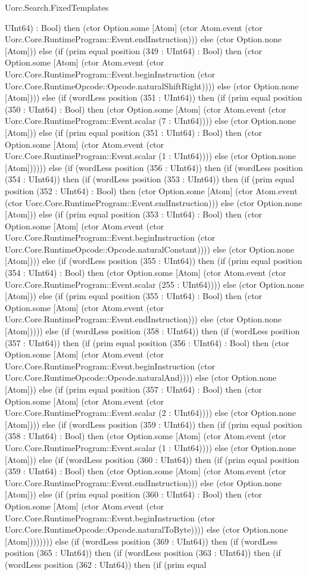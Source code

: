 \begin{lexlean}{Uorc.Search.FixedTemplates}
\begin{semanticmodule}
{UInt64) : Bool) then (ctor Option.some [Atom] (ctor Atom.event (ctor Uorc.Core.RuntimeProgram::Event.endInstruction))) else (ctor Option.none [Atom])) else (if (prim equal position (349 : UInt64) : Bool) then (ctor Option.some [Atom] (ctor Atom.event (ctor Uorc.Core.RuntimeProgram::Event.beginInstruction (ctor Uorc.Core.RuntimeOpcode::Opcode.naturalShiftRight)))) else (ctor Option.none [Atom]))) else (if (wordLess position (351 : UInt64)) then (if (prim equal position (350 : UInt64) : Bool) then (ctor Option.some [Atom] (ctor Atom.event (ctor Uorc.Core.RuntimeProgram::Event.scalar (7 : UInt64)))) else (ctor Option.none [Atom])) else (if (prim equal position (351 : UInt64) : Bool) then (ctor Option.some [Atom] (ctor Atom.event (ctor Uorc.Core.RuntimeProgram::Event.scalar (1 : UInt64)))) else (ctor Option.none [Atom]))))) else (if (wordLess position (356 : UInt64)) then (if (wordLess position (354 : UInt64)) then (if (wordLess position (353 : UInt64)) then (if (prim equal position (352 : UInt64) : Bool) then (ctor Option.some [Atom] (ctor Atom.event (ctor Uorc.Core.RuntimeProgram::Event.endInstruction))) else (ctor Option.none [Atom])) else (if (prim equal position (353 : UInt64) : Bool) then (ctor Option.some [Atom] (ctor Atom.event (ctor Uorc.Core.RuntimeProgram::Event.beginInstruction (ctor Uorc.Core.RuntimeOpcode::Opcode.naturalConstant)))) else (ctor Option.none [Atom]))) else (if (wordLess position (355 : UInt64)) then (if (prim equal position (354 : UInt64) : Bool) then (ctor Option.some [Atom] (ctor Atom.event (ctor Uorc.Core.RuntimeProgram::Event.scalar (255 : UInt64)))) else (ctor Option.none [Atom])) else (if (prim equal position (355 : UInt64) : Bool) then (ctor Option.some [Atom] (ctor Atom.event (ctor Uorc.Core.RuntimeProgram::Event.endInstruction))) else (ctor Option.none [Atom])))) else (if (wordLess position (358 : UInt64)) then (if (wordLess position (357 : UInt64)) then (if (prim equal position (356 : UInt64) : Bool) then (ctor Option.some [Atom] (ctor Atom.event (ctor Uorc.Core.RuntimeProgram::Event.beginInstruction (ctor Uorc.Core.RuntimeOpcode::Opcode.naturalAnd)))) else (ctor Option.none [Atom])) else (if (prim equal position (357 : UInt64) : Bool) then (ctor Option.some [Atom] (ctor Atom.event (ctor Uorc.Core.RuntimeProgram::Event.scalar (2 : UInt64)))) else (ctor Option.none [Atom]))) else (if (wordLess position (359 : UInt64)) then (if (prim equal position (358 : UInt64) : Bool) then (ctor Option.some [Atom] (ctor Atom.event (ctor Uorc.Core.RuntimeProgram::Event.scalar (1 : UInt64)))) else (ctor Option.none [Atom])) else (if (wordLess position (360 : UInt64)) then (if (prim equal position (359 : UInt64) : Bool) then (ctor Option.some [Atom] (ctor Atom.event (ctor Uorc.Core.RuntimeProgram::Event.endInstruction))) else (ctor Option.none [Atom])) else (if (prim equal position (360 : UInt64) : Bool) then (ctor Option.some [Atom] (ctor Atom.event (ctor Uorc.Core.RuntimeProgram::Event.beginInstruction (ctor Uorc.Core.RuntimeOpcode::Opcode.naturalToByte)))) else (ctor Option.none [Atom]))))))) else (if (wordLess position (369 : UInt64)) then (if (wordLess position (365 : UInt64)) then (if (wordLess position (363 : UInt64)) then (if (wordLess position (362 : UInt64)) then (if (prim equal }
\end{semanticmodule}
\end{lexlean}
